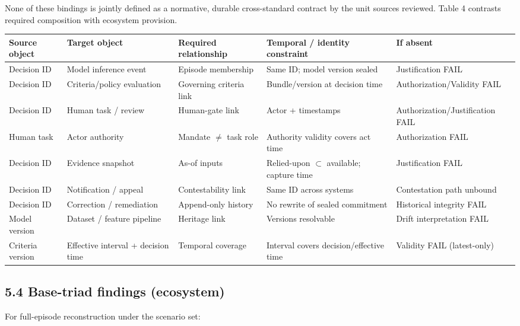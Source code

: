 \documentclass[11pt,a4paper]{article}
\begin{document}
None of these bindings is jointly defined as a normative, durable cross-standard contract by the unit sources reviewed. Table 4 contrasts required composition with ecosystem provision.




\begin{table}[t]
\centering
\small
\begin{tabularx}{\textwidth}{|X|X|X|X|X|}
\hline
 Source object & Target object & Required relationship & Temporal / identity constraint & If absent \\
 \hline
 \hline
 Decision ID & Model inference event & Episode membership & Same ID; model version sealed & Justification FAIL \\
 \hline
 Decision ID & Criteria/policy evaluation & Governing criteria link & Bundle/version at decision time & Authorization/Validity FAIL \\
 \hline
 Decision ID & Human task / review & Human-gate link & Actor + timestamps & Authorization/Justification FAIL \\
 \hline
 Human task & Actor authority & Mandate $\neq$ task role & Authority validity covers act time & Authorization FAIL \\
 \hline
 Decision ID & Evidence snapshot & As-of inputs & Relied-upon $\subset$ available; capture time & Justification FAIL \\
 \hline
 Decision ID & Notification / appeal & Contestability link & Same ID across systems & Contestation path unbound \\
 \hline
 Decision ID & Correction / remediation & Append-only history & No rewrite of sealed commitment & Historical integrity FAIL \\
 \hline
 Model version & Dataset / feature pipeline & Heritage link & Versions resolvable & Drift interpretation FAIL \\
 \hline
 Criteria version & Effective interval + decision time & Temporal coverage & Interval covers decision/effective time & Validity FAIL (latest-only) \\
 \hline
\end{tabularx}
\end{table}


\subsection{5.4 Base-triad findings (ecosystem)}

For full-episode reconstruction under the scenario set:
\end{document}
